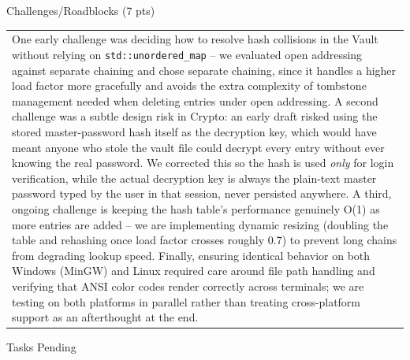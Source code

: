 \documentclass[12pt,a4paper]{article}
\newcommand{\sectiontitle}[1]{%
    {\color{GEUBlue}
    \fontsize{18}{22}\selectfont #1}
}
\newcommand{\answerbox}[2][]{%
    \begin{tabularx}{\textwidth}{
        |>{\raggedright\arraybackslash}X|}
        \hline
        \parbox[t]{\dimexpr\linewidth-12pt\relax}{
            \vspace{5pt}
            \fontsize{11}{13}\selectfont #2
            \vspace{5pt}
        }\\
        \hline
    \end{tabularx}
}
\begin{document}
\sectiontitle{Challenges/Roadblocks (7 pts)}

\vspace{0.05cm}


\vspace{0.18cm}

\answerbox{One early challenge was deciding how to resolve hash collisions in the Vault without relying on \texttt{std::unordered\_map} -- we evaluated open addressing against separate chaining and chose separate chaining, since it handles a higher load factor more gracefully and avoids the extra complexity of tombstone management needed when deleting entries under open addressing. A second challenge was a subtle design risk in Crypto: an early draft risked using the stored master-password hash itself as the decryption key, which would have meant anyone who stole the vault file could decrypt every entry without ever knowing the real password. We corrected this so the hash is used \emph{only} for login verification, while the actual decryption key is always the plain-text master password typed by the user in that session, never persisted anywhere. A third, ongoing challenge is keeping the hash table's performance genuinely O(1) as more entries are added -- we are implementing dynamic resizing (doubling the table and rehashing once load factor crosses roughly 0.7) to prevent long chains from degrading lookup speed. Finally, ensuring identical behavior on both Windows (MinGW) and Linux required care around file path handling and verifying that ANSI color codes render correctly across terminals; we are testing on both platforms in parallel rather than treating cross-platform support as an afterthought at the end.}

\vspace{0.65cm}

\sectiontitle{Tasks Pending}

\vspace{0.05cm}


\vspace{0.18cm}
\end{document}
